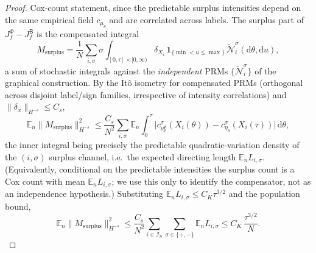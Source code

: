 \documentclass[a4paper,fleqn]{cas-sc}
\theoremstyle{definition}
\theoremstyle{remark}
\begin{document}
\begin{proof}
Cox-count statement, since the predictable surplus intensities depend on the same
empirical field $c_{\mu_\theta}$ and are correlated across labels. The surplus part of
$J^\Phi_f-J^{\mathsf B}_f$ is the compensated integral
\[
M_{\mathrm{surplus}}
=\frac1N\sum_{i,\sigma}\sigma\!\int_{[0,\tau]\times[0,\infty)}
\delta_{X_i}\,\mathbf 1_{\{\min<u\le\max\}}\,\widetilde{\mathcal N}^\sigma_i(\mathrm d\theta,\mathrm du),
\]
a sum of stochastic integrals against the \emph{independent} PRMs
$\{\widetilde{\mathcal N}^\sigma_i\}$ of the graphical construction. By the It\^o
isometry for compensated PRMs (orthogonal across disjoint label/sign families,
irrespective of intensity correlations) and $\|\delta_x\|_{H^{-s}}\le C_s$,
\[
\mathbb E_n\|M_{\mathrm{surplus}}\|_{H^{-s}}^2
\le\frac{C_s}{N^2}\sum_{i,\sigma}
\mathbb E_n\!\int_0^\tau\!\!\bigl|c^\sigma_{\nu^\Phi_\theta}(X_i(\theta))
-c^\sigma_{\eta_\theta}(X_i(\tau))\bigr|\,\mathrm d\theta,
\]
the inner integral being precisely the predictable quadratic-variation density of the
$(i,\sigma)$ surplus channel, i.e.\ the expected directing length
$\mathbb E_n L_{i,\sigma}$. (Equivalently, conditional on the predictable intensities
the surplus count is a Cox count with mean $\mathbb E_n L_{i,\sigma}$; we use this only
to identify the compensator, not as an independence hypothesis.) Substituting
$\mathbb E_n L_{i,\sigma}\le C_K\tau^{3/2}$ and the population bound,
\[
\mathbb E_n\|M_{\mathrm{surplus}}\|_{H^{-s}}^2
\le\frac{C_s}{N^2}\sum_{i\in\mathcal I_n}\sum_{\sigma\in\{+,-\}}\mathbb E_n L_{i,\sigma}
\le C_K\,\frac{\tau^{3/2}}{N}.
\]


\end{proof}
\end{document}
